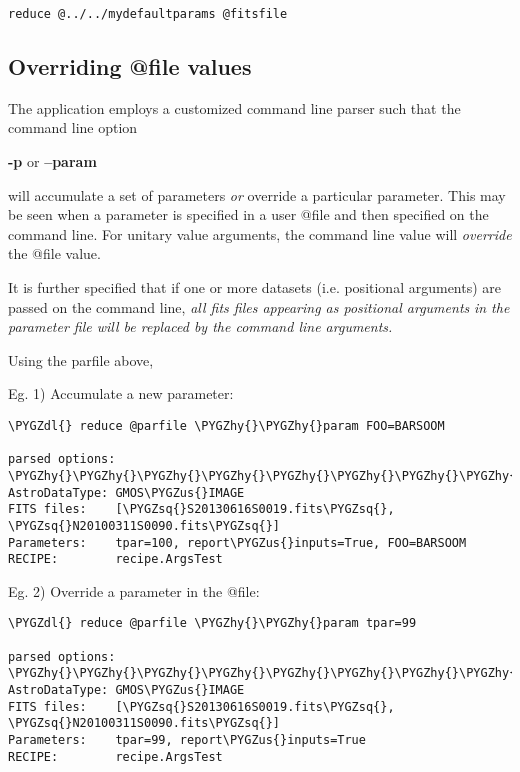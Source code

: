 \documentclass[letterpaper,10pt,english]{sphinxmanual}
\def\PYGZus{\char`\_}
\def\PYGZdl{\char`\$}
\def\PYGZhy{\char`\-}
\def\PYGZsq{\char`\'}
\begin{document}
\begin{Verbatim}[commandchars=\\\{\}]
reduce @../../mydefaultparams @fitsfile
\end{Verbatim}


\subsection{Overriding @file values}
\label{interfaces:overriding-file-values}
The  application employs a customized command line parser such that
the command line option

\textbf{-p} or \textbf{--param}

will accumulate a set of parameters \emph{or} override a particular parameter.
This may be seen when a parameter is specified in a user @file and then
specified on the command line. For unitary value arguments, the command line
value will \emph{override} the @file value.

It is further specified that if one or more datasets (i.e. positional arguments)
are passed on the command line, \emph{all fits files appearing as positional arguments}
\emph{in the parameter file will be replaced by the command line arguments.}

Using the parfile above,

Eg. 1)  Accumulate a new parameter:

\begin{Verbatim}[commandchars=\\\{\}]
\PYGZdl{} reduce @parfile \PYGZhy{}\PYGZhy{}param FOO=BARSOOM

parsed options:
\PYGZhy{}\PYGZhy{}\PYGZhy{}\PYGZhy{}\PYGZhy{}\PYGZhy{}\PYGZhy{}\PYGZhy{}\PYGZhy{}\PYGZhy{}\PYGZhy{}\PYGZhy{}\PYGZhy{}\PYGZhy{}\PYGZhy{}
AstroDataType: GMOS\PYGZus{}IMAGE
FITS files:    [\PYGZsq{}S20130616S0019.fits\PYGZsq{}, \PYGZsq{}N20100311S0090.fits\PYGZsq{}]
Parameters:    tpar=100, report\PYGZus{}inputs=True, FOO=BARSOOM
RECIPE:        recipe.ArgsTest
\end{Verbatim}

Eg. 2) Override a parameter in the @file:

\begin{Verbatim}[commandchars=\\\{\}]
\PYGZdl{} reduce @parfile \PYGZhy{}\PYGZhy{}param tpar=99

parsed options:
\PYGZhy{}\PYGZhy{}\PYGZhy{}\PYGZhy{}\PYGZhy{}\PYGZhy{}\PYGZhy{}\PYGZhy{}\PYGZhy{}\PYGZhy{}\PYGZhy{}\PYGZhy{}\PYGZhy{}\PYGZhy{}\PYGZhy{}
AstroDataType: GMOS\PYGZus{}IMAGE
FITS files:    [\PYGZsq{}S20130616S0019.fits\PYGZsq{}, \PYGZsq{}N20100311S0090.fits\PYGZsq{}]
Parameters:    tpar=99, report\PYGZus{}inputs=True
RECIPE:        recipe.ArgsTest
\end{Verbatim}
\end{document}
